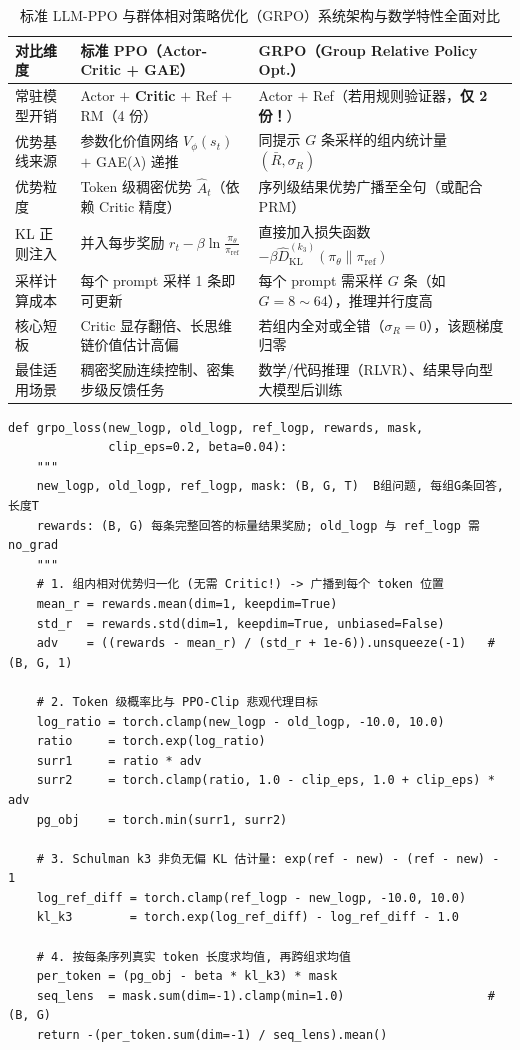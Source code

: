\begin{table}[htbp]
\centering
\caption{标准 LLM-PPO 与群体相对策略优化（GRPO）系统架构与数学特性全面对比}
\label{tab:ppo-vs-grpo}
\footnotesize
\begin{tabularx}{\linewidth}{@{}p{27mm}XX@{}}
\toprule
\textbf{对比维度} & \textbf{标准 PPO（Actor-Critic + GAE）} & \textbf{GRPO（Group Relative Policy Opt.）} \\
\midrule
常驻模型开销 & Actor $+$ \textbf{Critic} $+$ Ref $+$ RM（4 份） & Actor $+$ Ref（若用规则验证器，\textbf{仅 2 份！}） \\
优势基线来源 & 参数化价值网络 $V_\phi(s_t)$ $+$ GAE($\lambda$) 递推 & 同提示 $G$ 条采样的组内统计量 $(\bar{R}, \sigma_R)$ \\
优势粒度 & Token 级稠密优势 $\hat{A}_t$（依赖 Critic 精度） & 序列级结果优势广播至全句（或配合 PRM） \\
KL 正则注入 & 并入每步奖励 $r_t - \beta \ln\frac{\pi_\theta}{\pi_{\mathrm{ref}}}$ & 直接加入损失函数 $-\beta \hat{D}_{\mathrm{KL}}^{(k_3)}(\pi_\theta \| \pi_{\mathrm{ref}})$ \\
采样计算成本 & 每个 prompt 采样 1 条即可更新 & 每个 prompt 需采样 $G$ 条（如 $G=8 \sim 64$），推理并行度高 \\
核心短板 & Critic 显存翻倍、长思维链价值估计高偏 & 若组内全对或全错（$\sigma_R = 0$），该题梯度归零 \\
最佳适用场景 & 稠密奖励连续控制、密集步级反馈任务 & 数学/代码推理（RLVR）、结果导向型大模型后训练 \\
\bottomrule
\end{tabularx}
\end{table}

\begin{lstlisting}[caption={GRPO 核心损失函数（群体相对优势归一化 $+$ PPO-Clip $+$ 非负 $k_3$ KL 正则）}]
def grpo_loss(new_logp, old_logp, ref_logp, rewards, mask,
              clip_eps=0.2, beta=0.04):
    """
    new_logp, old_logp, ref_logp, mask: (B, G, T)  B组问题, 每组G条回答, 长度T
    rewards: (B, G) 每条完整回答的标量结果奖励; old_logp 与 ref_logp 需 no_grad
    """
    # 1. 组内相对优势归一化 (无需 Critic!) -> 广播到每个 token 位置
    mean_r = rewards.mean(dim=1, keepdim=True)
    std_r  = rewards.std(dim=1, keepdim=True, unbiased=False)
    adv    = ((rewards - mean_r) / (std_r + 1e-6)).unsqueeze(-1)   # (B, G, 1)

    # 2. Token 级概率比与 PPO-Clip 悲观代理目标
    log_ratio = torch.clamp(new_logp - old_logp, -10.0, 10.0)
    ratio     = torch.exp(log_ratio)
    surr1     = ratio * adv
    surr2     = torch.clamp(ratio, 1.0 - clip_eps, 1.0 + clip_eps) * adv
    pg_obj    = torch.min(surr1, surr2)

    # 3. Schulman k3 非负无偏 KL 估计量: exp(ref - new) - (ref - new) - 1
    log_ref_diff = torch.clamp(ref_logp - new_logp, -10.0, 10.0)
    kl_k3        = torch.exp(log_ref_diff) - log_ref_diff - 1.0

    # 4. 按每条序列真实 token 长度求均值, 再跨组求均值
    per_token = (pg_obj - beta * kl_k3) * mask
    seq_lens  = mask.sum(dim=-1).clamp(min=1.0)                    # (B, G)
    return -(per_token.sum(dim=-1) / seq_lens).mean()
\end{lstlisting}

